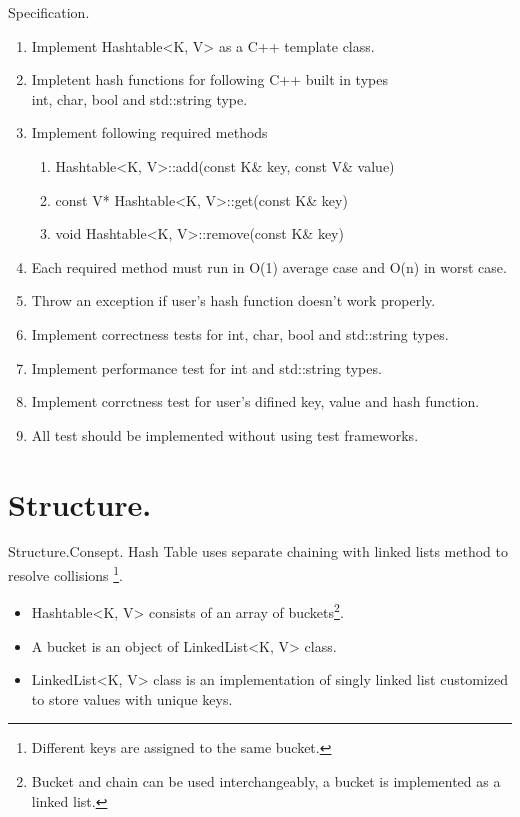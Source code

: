 \documentclass{beamer}
\begin{document}
\begin{frame}[allowframebreaks]{Specification.}
  \begin{enumerate}
  \item Implement Hashtable<K, V> as a C++ template class.
  \item Impletent hash functions for following C++ built in types \\
    int, char, bool and std::string type.
  \item Implement following required methods
  \begin{enumerate}
    \item Hashtable<K, V>::add(const K\& key, const V\& value)
    \item const V* Hashtable<K, V>::get(const K\& key)
    \item void Hashtable<K, V>::remove(const K\& key)
  \end{enumerate}
  \item Each required method must run in O(1) average case and O(n) in worst case.
  \item Throw an exception if user's hash function doesn't work properly. 
    \framebreak
  \item Implement correctness tests for int, char, bool and std::string types.
  \item Implement performance test for int and std::string types. 
  \item Implement corrctness test for user's difined key, value and hash function.
  \item All test should be implemented without using test frameworks.

  \end{enumerate}

\end{frame}

\section{Structure.}
\begin{frame}{Structure.}{Consept.}
  Hash Table uses separate chaining with linked lists method to resolve collisions
  \footnote{Different keys are assigned to the same bucket.}.
  
  \begin{itemize}
  \item Hashtable<K, V> consists of an array of buckets\footnote{Bucket and chain can be used interchangeably, a bucket is implemented as a linked list.}.
  \item A bucket is an object of LinkedList<K, V> class.
  \item LinkedList<K, V> class is an implementation of singly linked list customized to store values with unique keys.
  \end{itemize}
\end{frame}
\end{document}
